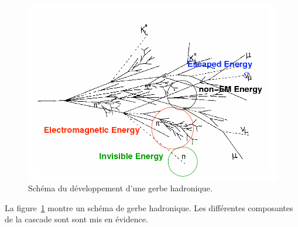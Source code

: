 \begin{figure}[!h]
  \begin{center}
    \includegraphics[width=.8\textwidth]{SDHCAL/figs/had-shower.png}
    \caption{Schéma du développement d'une gerbe hadronique.}
    \label{fig:showerScheme}
  \end{center}
\end{figure}
La figure~\ref{fig:showerScheme} montre un schéma de gerbe hadronique. Les différentes composantes de la cascade sont sont mis en évidence.



